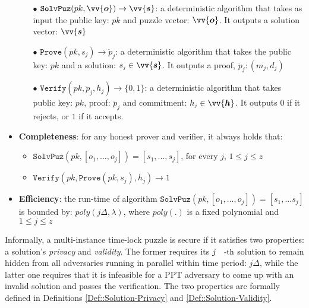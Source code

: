 \begin{definition}
\begin{itemize}[leftmargin=.43cm]
\begin{itemize}
\item[$\bullet$]$\mathtt {SolvPuz}(pk,\vv{\bm{o}})\rightarrow \vv{\bm{s}}$:   a deterministic algorithm that takes as input  the public key: $pk$ and  puzzle vector: $\vv{\bm{o}}$. It outputs a solution vector: $\vv{\bm{s}}$

\item[$\bullet$]$\mathtt {Prove}(pk,s_{\scriptscriptstyle j})\rightarrow \ddot{p}_{\scriptscriptstyle j}$:  a deterministic algorithm that takes the public key: $pk$ and a solution: $s_{\scriptscriptstyle j}\in\vv{\bm{s}}$. It outputs a proof, $\ddot{p}_{\scriptscriptstyle j}:(m_{\scriptscriptstyle j},d_{\scriptscriptstyle j})$

\item[$\bullet$]$\mathtt {Verify}(pk,\ddot{p}_{\scriptscriptstyle j},h_{\scriptscriptstyle j})\rightarrow \{0,1\}$:  a deterministic algorithm that takes  public key: $pk$,  proof: $\ddot{p}_{\scriptscriptstyle j}$ and commitment: $h_{\scriptscriptstyle j}\in \vv{\bm{h}}$. It outputs  $0$ if it rejects, or $1$ if it accepts. 
\end{itemize}
\item \textbf{Completeness}: for any honest prover and verifier, it always holds that: 
\begin{itemize}
\item$\mathtt{SolvPuz}(pk,[o_{\scriptscriptstyle 1},...,o_{\scriptscriptstyle j}])=[s_{\scriptscriptstyle1},...,s_{\scriptscriptstyle j}]$, for every $j$, $1\leq j\leq z$

\item $\mathtt {Verify}(pk,\mathtt {Prove}(pk,s_{\scriptscriptstyle j}),h_{\scriptscriptstyle j})\rightarrow 1$
\end{itemize}
\item \textbf{Efficiency}: the run-time of algorithm $\mathtt {SolvPuz}(pk,[o_{\scriptscriptstyle 1},...,o_{\scriptscriptstyle j}])=[s_{\scriptscriptstyle1},...s_{\scriptscriptstyle j}]$ is bounded by:  $ poly(j\Delta,\lambda)$, where $poly(.)$ is a fixed polynomial and  $1\leq j\leq z$
\end{itemize}
\end{definition}
 
Informally, a multi-instance time-lock puzzle is secure if it satisfies two properties:  a solution's \emph{privacy} and  \emph{validity}. The former  requires  its $j\text{\small{-th}}$ solution   to remain hidden from all adversaries running in parallel within  time period: $j \Delta$, while the latter one requires that it is  infeasible for  a PPT adversary to come up with an invalid solution  and passes the verification. The two properties are formally defined in Definitions \ref{Def::Solution-Privacy} and \ref{Def::Solution-Validity}.
 

